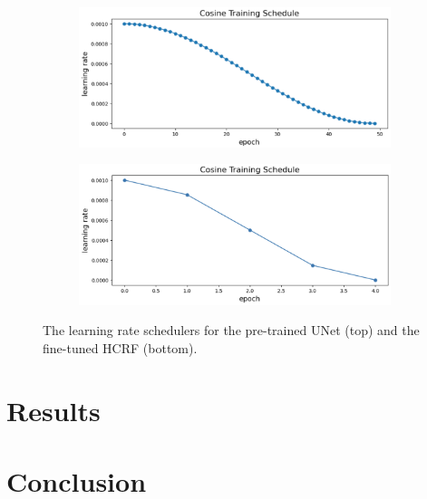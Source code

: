 \documentclass[conference]{IEEEtran}
\begin{document}
\begin{figure}
\centering
\begin{subfigure}[b]{0.45\textwidth}
\includegraphics[width=\textwidth]{pretrain}
\end{subfigure}
\hfill
\begin{subfigure}[b]{0.45\textwidth}
\includegraphics[width=\textwidth]{finetune}
\end{subfigure}
\caption{The learning rate schedulers for the pre-trained UNet (top) and
the fine-tuned HCRF (bottom).}
\label{fig:cos}
\end{figure}


\section{Results}


\section{Conclusion}




\end{document}
